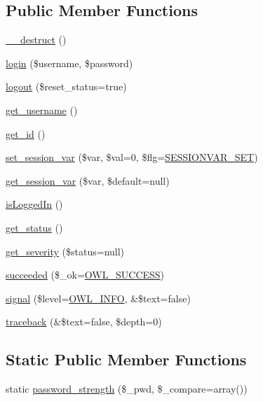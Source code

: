 \subsection*{Public Member Functions}
\begin{DoxyCompactItemize}
\item 
\hyperlink{classUser_accd20149a7414612c1505e022eb63ffc}{\_\-\_\-destruct} ()
\item 
\hyperlink{classUser_a2c4fae5935ebf84e787126795bf42988}{login} (\$username, \$password)
\item 
\hyperlink{classUser_a95e19a7d141f922c2870a6404ff641b1}{logout} (\$reset\_\-status=true)
\item 
\hyperlink{classUser_a1348ddf190d4df2518665fb51305a902}{get\_\-username} ()
\item 
\hyperlink{classUser_a21bee530c9f8304e9e74e274f0f655af}{get\_\-id} ()
\item 
\hyperlink{classUser_a80108765c46ddec1ab776a774ae07f53}{set\_\-session\_\-var} (\$var, \$val=0, \$flg=\hyperlink{class_8sessionhandler_8php_af9e860b1663497a46177b0ec35d6a9f5}{SESSIONVAR\_\-SET})
\item 
\hyperlink{classUser_a84f3693077e777cc1d61b45fcecdb36c}{get\_\-session\_\-var} (\$var, \$default=null)
\item 
\hyperlink{classUserHandler_a4539c12ed2ce12a9147d61496854d5ab}{isLoggedIn} ()
\item 
\hyperlink{class__OWL_a99ec771fa2c5c279f80152cc09e489a8}{get\_\-status} ()
\item 
\hyperlink{class__OWL_adf9509ef96858be7bdd9414c5ef129aa}{get\_\-severity} (\$status=null)
\item 
\hyperlink{class__OWL_ae76c46aff1ad253106332670fc59c777}{succeeded} (\$\_\-ok=\hyperlink{owl_8severitycodes_8php_a96223f06ba27bf5cbefa6e9d702897c2}{OWL\_\-SUCCESS})
\item 
\hyperlink{class__OWL_a51ba4a16409acf2a2f61f286939091a5}{signal} (\$level=\hyperlink{owl_8severitycodes_8php_a139328861128689f2f4def6a399d9057}{OWL\_\-INFO}, \&\$text=false)
\item 
\hyperlink{class__OWL_aa29547995d6741b7d2b90c1d4ea99a13}{traceback} (\&\$text=false, \$depth=0)
\end{DoxyCompactItemize}
\subsection*{Static Public Member Functions}
\begin{DoxyCompactItemize}
\item 
static \hyperlink{classUser_a4d4ea8d545686fa335e8597f1bab73d2}{password\_\-strength} (\$\_\-pwd, \$\_\-compare=array())
\end{DoxyCompactItemize}
